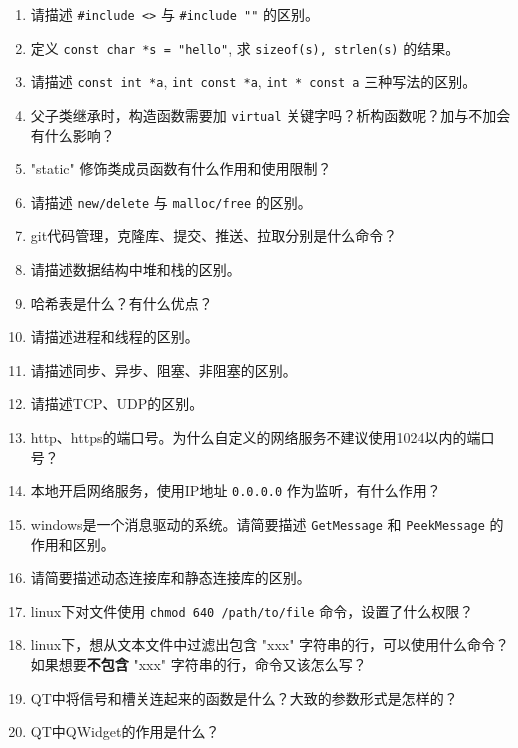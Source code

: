 \documentclass{article}
\newcommand{\answerspace}[1][5]{\vspace{#1\baselineskip}}
\newcommand{\questionitem}[2][5]{\item#2\answerspace[#1]}
\begin{document}
\begin{enumerate}[leftmargin=*]

  \questionitem 请描述 \verb|#include <>| 与 \verb|#include ""| 的区别。

  \questionitem[3] 定义 \verb|const char *s = "hello"|, 求 \verb|sizeof(s), strlen(s)| 的结果。

  \questionitem 请描述 \verb|const int *a|, \verb|int const *a|, \verb|int * const a| 三种写法的区别。

  \questionitem 父子类继承时，构造函数需要加 \verb|virtual| 关键字吗？析构函数呢？加与不加会有什么影响？

  \questionitem "static" 修饰类成员函数有什么作用和使用限制？

  \questionitem 请描述 \verb|new/delete| 与 \verb|malloc/free| 的区别。

  \questionitem[3] git代码管理，克隆库、提交、推送、拉取分别是什么命令？

  \questionitem[3] 请描述数据结构中堆和栈的区别。

  \questionitem[3] 哈希表是什么？有什么优点？

  \questionitem[3] 请描述进程和线程的区别。

  \questionitem 请描述同步、异步、阻塞、非阻塞的区别。

  \questionitem[3] 请描述TCP、UDP的区别。

  \questionitem http、https的端口号。为什么自定义的网络服务不建议使用1024以内的端口号？

  \questionitem 本地开启网络服务，使用IP地址 \verb|0.0.0.0| 作为监听，有什么作用？

  \questionitem[8] windows是一个消息驱动的系统。请简要描述 \verb|GetMessage| 和 \verb|PeekMessage| 的作用和区别。

  \questionitem[6] 请简要描述动态连接库和静态连接库的区别。

  \questionitem[4] linux下对文件使用 \verb|chmod 640 /path/to/file| 命令，设置了什么权限？

  \questionitem[4] {linux下，想从文本文件中过滤出包含 "xxx" 字符串的行，可以使用什么命令？如果想要\textbf{不包含} "xxx" 字符串的行，命令又该怎么写？}

  \questionitem QT中将信号和槽关连起来的函数是什么？大致的参数形式是怎样的？

  \questionitem QT中QWidget的作用是什么？


\end{enumerate}
\end{document}
